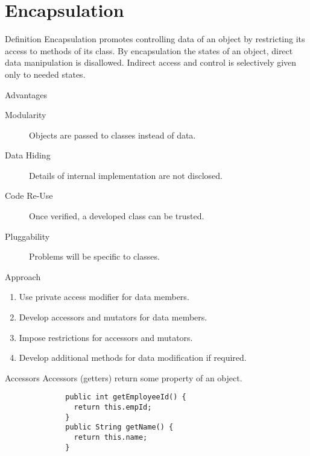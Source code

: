 \documentclass[10pt, compress]{beamer}
\begin{document}
\section{Encapsulation}

\begin{slide}
	\begin{block}{Definition}
		Encapsulation promotes controlling data of an object by restricting its access to methods of its class.
		By encapsulation the states of an object, direct data manipulation is disallowed.
		Indirect access and control is selectively given only to needed states.
	\end{block}
\end{slide}

\begin{slide}
	\begin{block}{Advantages}
		\begin{description}
			\item[Modularity] Objects are passed to classes instead of data.
			\item[Data Hiding] Details of internal implementation are not disclosed.
			\item[Code Re-Use] Once verified, a developed class can be trusted.
			\item[Pluggability] Problems will be specific to classes.
		\end{description}
	\end{block}
\end{slide}

\begin{slide}
	\begin{block}{Approach}
		\begin{enumerate}
			\item[] Use private access modifier for data members.
			\item[] Develop accessors and mutators for data members.
			\item[] Impose restrictions for accessors and mutators.
			\item[] Develop additional methods for data modification if required.
		\end{enumerate}
	\end{block}
\end{slide}

\begin{slide}
	\begin{block}{Accessors}
		Accessors (getters) return some property of an object.
		\begin{verbatim}
			  public int getEmployeeId() {
			    return this.empId;
			  }
			  public String getName() {
			    return this.name;
			  }
		\end{verbatim}
	\end{block}
\end{slide}
\end{document}
